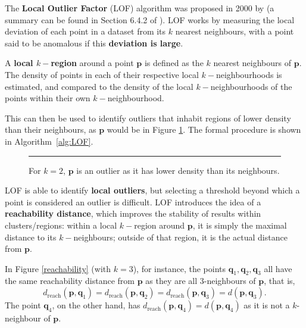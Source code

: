 The \textbf{Local Outlier Factor} (LOF) algorithm was proposed in 2000 by \cite{LOF} 
(a summary can be found in Section 6.4.2 of \cite{A10}). 
LOF works by measuring the local deviation of each point in a dataset from its $k$ nearest neighbours, with a point said to be anomalous if this \textbf{deviation is large}.

A \textbf{local $k-$region} around a point $\mathbf{p}$ is defined as the $k$ nearest neighbours of $\mathbf{p}$. The density of points in each of their respective local $k-$neighbourhoods is estimated, and compared to the density of the local $k-$neighbourhoods of the points within their own $k-$neighbourhood.

This can then be used to identify outliers that inhabit regions of lower density than their neighbours,
as $\mathbf{p}$ would be in Figure \ref{lofoutlier}. The formal procedure is shown in Algorithm~\ref{alg:LOF}. 

\begin{figure}[H]
\hrule \vspace{0.4cm}
\centering
{}
\caption{For $k=2$, $\mathbf{p}$ is an outlier as it has lower density than its neighbours.}
\label{lofoutlier}
\end{figure}
\noindent LOF is able to identify \textbf{local outliers}, but selecting a threshold beyond which a point is considered an outlier is difficult. \newl LOF introduces the idea of a \textbf{reachability distance}, which improves the stability of results within clusters/regions: within a local $k-$region around $\mathbf{p}$, it is simply the maximal distance to its $k-$neighbours; outside of that region, it is the actual distance from $\mathbf{p}$. 
\par In Figure \ref{reachability} (with $k=3$), for instance, the points $\mathbf{q}_1, \mathbf{q}_2, \mathbf{q}_3$ all have the same reachability distance from $\mathbf{p}$ as they are all $3$-neighbours of $\mathbf{p}$, that is, 
$$
d_{\text{reach}}(\mathbf{p}, \mathbf{q}_1) 
= d_{\text{reach}}(\mathbf{p}, \mathbf{q}_2)
= d_{\text{reach}}(\mathbf{p}, \mathbf{q}_3)
= d(\mathbf{p}, \mathbf{q}_3)
.$$
The point $\mathbf{q}_4$, on the other hand, has 
$d_{\text{reach}}(\mathbf{p}, \mathbf{q}_4)
= d(\mathbf{p}, \mathbf{q}_4)
$
as it is not a $k$-neighbour of $\mathbf{p}$.

